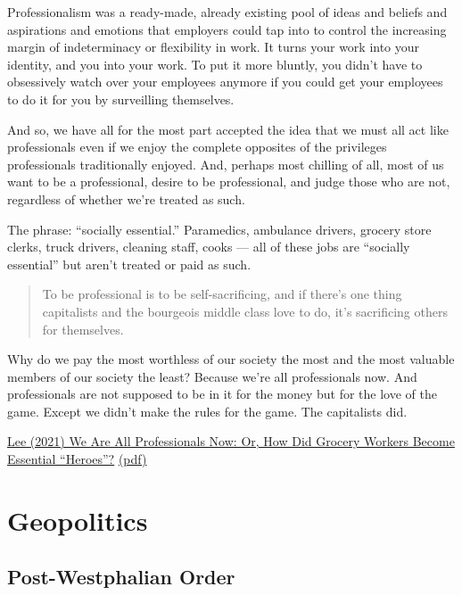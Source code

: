 \documentclass[
]{book}
\begin{document}
Professionalism was a
ready-made, already existing pool of ideas and beliefs and
aspirations and emotions that employers could tap into to
control the increasing margin of indeterminacy or flexibility in work.
It turns your
work into your identity, and you into your work.
To put it
more bluntly, you didn't have to obsessively watch over your
employees anymore if you could get your employees to do it
for you by surveilling themselves.

And so, we have all for the most part
accepted the idea that we must all act like professionals even
if we enjoy the complete opposites of the privileges
professionals traditionally enjoyed. And, perhaps most
chilling of all, most of us want to be a professional, desire to
be professional, and judge those who are not, regardless of
whether we're treated as such.

The phrase: ``socially essential.'' Paramedics,
ambulance drivers, grocery store clerks, truck drivers,
cleaning staff, cooks --- all of these jobs are ``socially
essential'' but aren't treated or paid as such.

\begin{quote}
To be professional is to be
self-sacrificing, and if there's one thing capitalists and the
bourgeois middle class love to do, it's sacrificing others for
themselves.
\end{quote}

Why do we pay the most worthless of our society the most and the most valuable members of our society the least?
Because we're all professionals now. And professionals are not supposed to be in it for the money but for the love of the game.
Except we didn't make the rules for the game.
The capitalists did.

\href{https://medium.com/@teioh/we-are-all-professionals-now-or-how-did-grocery-workers-become-heroes-4cba3ffcc034}{Lee (2021) We Are All Professionals Now: Or, How Did Grocery Workers Become Essential ``Heroes''?}
\href{pdf/Lee_Professionalism.pdf}{(pdf)}

\hypertarget{geopolitics}{%
\chapter{Geopolitics}\label{geopolitics}}

\hypertarget{post-westphalian-order}{%
\section{Post-Westphalian Order}\label{post-westphalian-order}}
\end{document}
